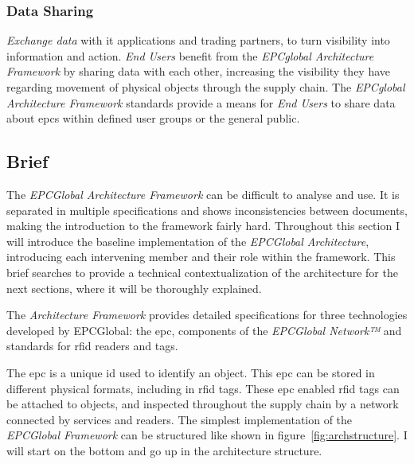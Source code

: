 \subsubsection{Data Sharing} 

\emph{Exchange data} with \ac{it} applications and trading partners, to turn visibility into information and action.
\emph{End Users} benefit from the \emph{EPCglobal Architecture Framework} by sharing data with each other, increasing the visibility they have regarding movement of physical objects through the supply chain. 
The \emph{EPCglobal Architecture Framework} standards provide a means for \emph{End Users} to share data about \acp{epc} within defined user groups or the general public. 



\subsection{Brief}



The \emph{EPCGlobal Architecture Framework} can be difficult to analyse and use. It is separated in multiple specifications and shows inconsistencies between documents, making the introduction to the framework fairly hard.
Throughout this section I will introduce the baseline implementation of the \emph{EPCGlobal Architecture}, introducing each intervening member and their role within the framework. This brief searches to provide a technical contextualization of the architecture for the next sections, where it will be thoroughly explained.

The \emph{Architecture Framework} provides detailed specifications for three technologies developed by EPCGlobal: the \acf{epc}, components of the \emph{EPCGlobal Network™} and standards for \ac{rfid} readers and tags.

The \ac{epc} is a unique \acs{id} used to identify an object. This \ac{epc} can be stored in different physical formats, including in \ac{rfid} tags. 
These \ac{epc} enabled \ac{rfid} tags can be attached to objects, and inspected throughout the supply chain by a network connected by services and readers.
The simplest implementation of the \emph{EPCGlobal Framework} can be structured like shown in figure~\ref{fig:archstructure}.
I will start on the bottom and go up in the architecture structure.

